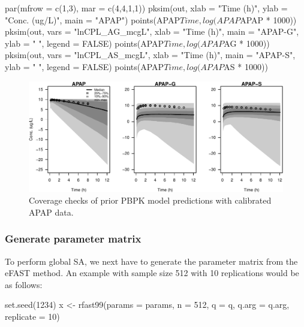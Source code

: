 \begin{Schunk}
\begin{Sinput}
par(mfrow = c(1,3), mar = c(4,4,1,1))
pksim(out, xlab = "Time (h)", ylab = "Conc. (ug/L)", main = "APAP")
points(APAP$Time, log(APAP$APAP * 1000))
pksim(out, vars = "lnCPL_AG_mcgL", xlab = "Time (h)", main = "APAP-G", 
      ylab = " ", legend = FALSE)
points(APAP$Time, log(APAP$AG * 1000))
pksim(out, vars = "lnCPL_AS_mcgL", xlab = "Time (h)", main = "APAP-S", 
      ylab = " ", legend = FALSE)
points(APAP$Time, log(APAP$AS * 1000))
\end{Sinput}
\begin{figure}

{\centering \includegraphics[width=1\linewidth]{RJ-pksensi_files/figure-latex/unnamed-chunk-27-1} 

}

\caption{\label{fig:pksim-MC}Coverage checks of prior PBPK model predictions with calibrated APAP data.}\label{fig:unnamed-chunk-27}
\end{figure}
\end{Schunk}

\hypertarget{generate-parameter-matrix}{%
\subsubsection{Generate parameter
matrix}\label{generate-parameter-matrix}}

To perform global SA, we next have to generate the parameter matrix from
the eFAST method. An example with sample size 512 with 10 replications
would be as follows:

\begin{Schunk}
\begin{Sinput}
set.seed(1234)
x <- rfast99(params = params, n = 512, q = q, q.arg = q.arg, replicate = 10) 
\end{Sinput}
\end{Schunk}

